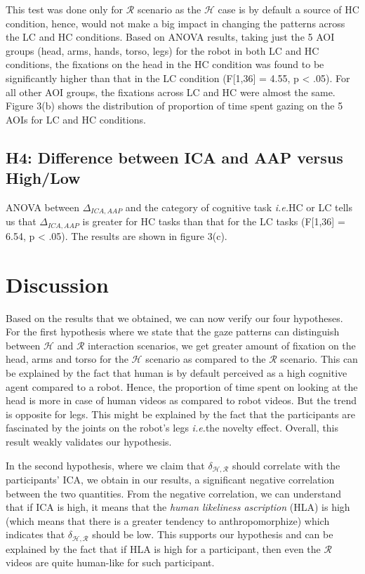 \documentclass[a4,twocolumn,10pt]{article}
\newcommand{\ie}{{\textit{i.e.\xspace}}}
\begin{document}
This test was done only for $\mathcal{R}$ scenario as the $\mathcal{H}$ case is
by default a source of HC condition, hence, would not make a big impact in
changing the patterns across the LC and HC conditions. Based on ANOVA results,
taking just the 5 AOI groups (head, arms, hands, torso, legs) for the robot in
both LC and HC conditions, the fixations on the head in the HC condition was
found to be significantly higher than that in the LC condition (F[1,36] = 4.55,
p < .05). For all other AOI groups, the fixations across LC and HC were almost
the same. Figure 3(b) shows the distribution of proportion of time spent gazing
on the 5 AOIs for LC and HC conditions.

\subsection{H4: Difference between ICA and AAP versus High/Low}

ANOVA between $\Delta_{ICA,AAP}$ and the category of cognitive task
\ie HC or LC tells us that $\Delta_{ICA,AAP}$ is greater for HC tasks
than that for the LC tasks (F[1,36] = 6.54, p < .05). The results are shown in
figure 3(c).


\section{Discussion}

Based on the results that we obtained, we can now verify our four hypotheses.
For the first hypothesis where we state that the gaze patterns can distinguish
between $\mathcal{H}$ and $\mathcal{R}$ interaction scenarios, we get greater
amount of fixation on the head, arms and torso for the $\mathcal{H}$ scenario as
compared to the $\mathcal{R}$ scenario. This can be explained by the fact that
human is by default perceived as a high cognitive agent compared to a robot.
Hence, the proportion of time spent on looking at the head is more in case of
human videos as compared to robot videos. But the trend is opposite for legs.
This might be explained by the fact that the participants are fascinated by the
joints on the robot's legs \ie the novelty effect. Overall, this
result weakly validates our hypothesis.

In the second hypothesis, where we claim that $\delta_{\mathcal{H},\mathcal{R}}$
should correlate with the participants' ICA, we obtain in our results, a
significant negative correlation between the two quantities. From the negative
correlation, we can understand that if ICA is high, it means that the
\textit{human likeliness ascription} (HLA) is high (which means that there is a
greater tendency to anthropomorphize) which indicates that
$\delta_{\mathcal{H},\mathcal{R}}$ should be low. This supports our hypothesis
and can be explained by the fact that if HLA is high for a participant, then
even the $\mathcal{R}$ videos are quite human-like for such participant. 
\end{document}
